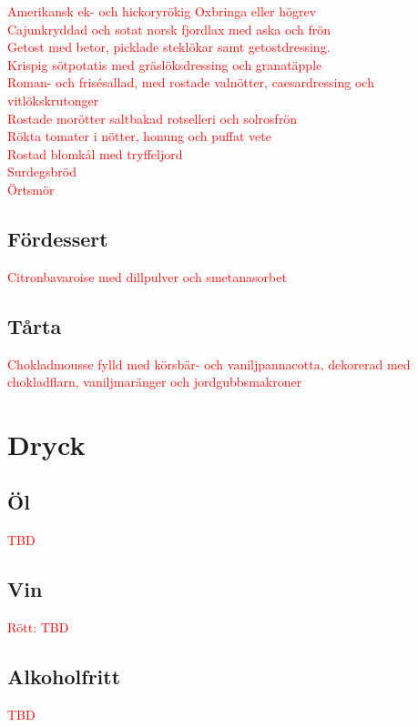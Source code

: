 \documentclass[a5paper]{article}
\begin{document}
		
	\begin{spacing}{1.3}
\textcolor{red}{
		Amerikansk ek- och hickoryrökig Oxbringa eller högrev \\ 
		Cajunkryddad och sotat norsk fjordlax med aska och frön \\
		Getost med betor, picklade steklökar samt getostdressing. \\
		Krispig sötpotatis med gräslöksdressing och granatäpple \\
		Roman- och frisésallad, med rostade valnötter, caesardressing och vitlökskrutonger \\
		Rostade morötter saltbakad rotselleri och solrosfrön \\
		Rökta tomater i nötter, honung och puffat vete \\
		Rostad blomkål med tryffeljord  \\
		Surdegsbröd \\
		Örtsmör \\
}
	\end{spacing}	

		\subsection*{Fördessert}
\textcolor{red}{
		Citronbavaroise med dillpulver och smetanasorbet
}		
		\subsection*{Tårta}

		\begin{spacing}{1.3}
\textcolor{red}{
		Chokladmousse fylld med körsbär- och vaniljpannacotta, dekorerad med chokladflarn, vaniljmaränger och jordgubbsmakroner
}
		\end{spacing}

	
	\newpage
	\section{Dryck}
	
	\subsection*{Öl}
\textcolor{red}{
	TBD
}	
	\subsection*{Vin}
\textcolor{red}{
	Rött: 
	TBD
}

	\subsection*{Alkoholfritt}
\textcolor{red}{
	TBD
}	
	
\end{document}
